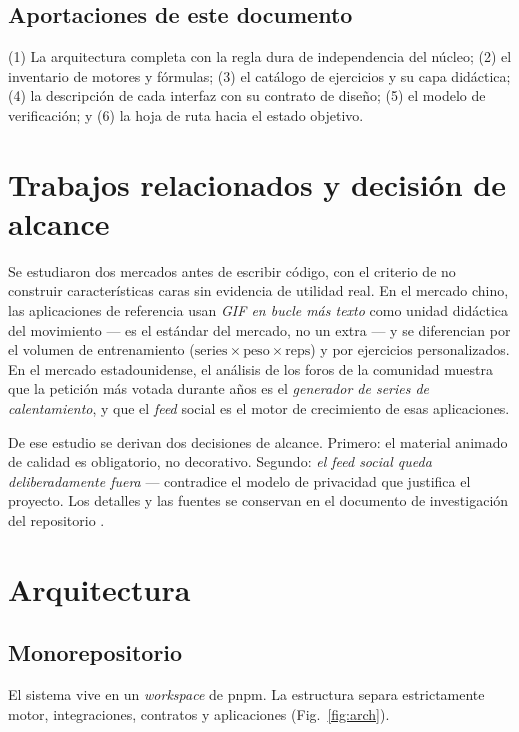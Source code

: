 \documentclass[conference]{IEEEtran}
\begin{document}
\subsection{Aportaciones de este documento}
(1) La arquitectura completa con la regla dura de independencia del n\'ucleo;
(2) el inventario de motores y f\'ormulas; (3) el cat\'alogo de ejercicios y su
capa did\'actica; (4) la descripci\'on de cada interfaz con su contrato de
dise\~no; (5) el modelo de verificaci\'on; y (6) la hoja de ruta hacia el estado
objetivo.

\section{Trabajos relacionados y decisi\'on de alcance}

Se estudiaron dos mercados antes de escribir c\'odigo, con el criterio de no
construir caracter\'isticas caras sin evidencia de utilidad real. En el mercado
chino, las aplicaciones de referencia usan \emph{GIF en bucle m\'as texto} como
unidad did\'actica del movimiento --- es el est\'andar del mercado, no un
extra --- y se diferencian por el volumen de entrenamiento
($\text{series} \times \text{peso} \times \text{reps}$) y por ejercicios
personalizados. En el mercado estadounidense, el an\'alisis de los foros de la
comunidad muestra que la petici\'on m\'as votada durante a\~nos es el
\emph{generador de series de calentamiento}, y que el \emph{feed} social es el
motor de crecimiento de esas aplicaciones.

De ese estudio se derivan dos decisiones de alcance. Primero: el material
animado de calidad es obligatorio, no decorativo. Segundo: \emph{el feed social
queda deliberadamente fuera} --- contradice el modelo de privacidad que
justifica el proyecto. Los detalles y las fuentes se conservan en el documento
de investigaci\'on del repositorio \cite{research}.

\section{Arquitectura}

\subsection{Monorepositorio}
El sistema vive en un \emph{workspace} de pnpm. La estructura separa
estrictamente motor, integraciones, contratos y aplicaciones
(Fig.~\ref{fig:arch}).
\end{document}
